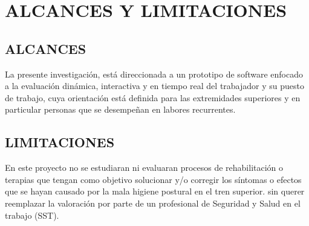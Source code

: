 \chapter{ALCANCES Y LIMITACIONES}
\section{ALCANCES}
La presente investigación, está direccionada a un prototipo de software enfocado a  la evaluación dinámica, interactiva y  en tiempo real del trabajador y su puesto de trabajo, cuya orientación está definida para las extremidades superiores y en particular personas que se desempeñan en labores recurrentes. 
\section{LIMITACIONES}
En este proyecto no se estudiaran ni evaluaran procesos de rehabilitación o terapias que tengan como objetivo solucionar y/o corregir los síntomas o efectos que se hayan causado por la mala higiene postural en el tren superior. sin querer reemplazar la valoración por parte de un profesional de Seguridad y Salud en el trabajo (SST).